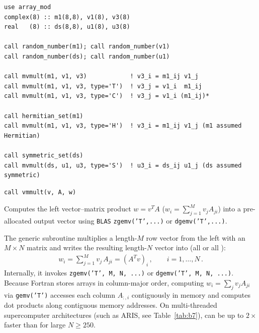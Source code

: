 \lstset{language=[95]Fortran}
\begin{lstlisting}
use array_mod
complex(8) :: m1(8,8), v1(8), v3(8)
real   (8) :: ds(8,8), u1(8), u3(8)

call random_number(m1); call random_number(v1)
call random_number(ds); call random_number(u1)

call mvmult(m1, v1, v3)            ! v3_i = m1_ij v1_j
call mvmult(m1, v1, v3, type='T')  ! v3_j = v1_i  m1_ij
call mvmult(m1, v1, v3, type='C')  ! v3_j = v1_i (m1_ij)*

call hermitian_set(m1)
call mvmult(m1, v1, v3, type='H')  ! v3_i = m1_ij v1_j (m1 assumed Hermitian)

call symmetric_set(ds)
call mvmult(ds, u1, u3, type='S')  ! u3_i = ds_ij u1_j (ds assumed symmetric)
\end{lstlisting}


\lstset{language=[95]Fortran}
\begin{lstlisting}
call vmmult(v, A, w)
\end{lstlisting}

Computes the left vector--matrix product $w = v^T A$ ($w_i = \sum_{j=1}^{M} v_j A_{ji}$) into a pre-allocated output vector  using \texttt{BLAS} \texttt{zgemv('T',...)} or \texttt{dgemv('T',...)}.

The generic subroutine  multiplies a length-$M$ row vector  from the left with an $M\times N$ matrix  and writes the resulting length-$N$ vector into  (all  or all ):
\begin{align}
  w_i = \sum_{j=1}^{M} v_j\, A_{ji} = (A^T v)_i\, , \qquad i = 1,\ldots,N\, .
\end{align}
Internally, it invokes \texttt{zgemv('T', M, N, ...)} or \texttt{dgemv('T', M, N, ...)}. Because Fortran stores arrays in column-major order, computing $w_i = \sum_j v_j A_{ji}$ via \texttt{gemv('T')} accesses each column $A_{:,i}$ contiguously in memory and computes dot products along contiguous memory addresses. On multi-threaded supercomputer architectures (such as ARIS, see Table~\ref{tab:b7}),  can be up to $2\times$ faster than  for large $N \ge 250$.

